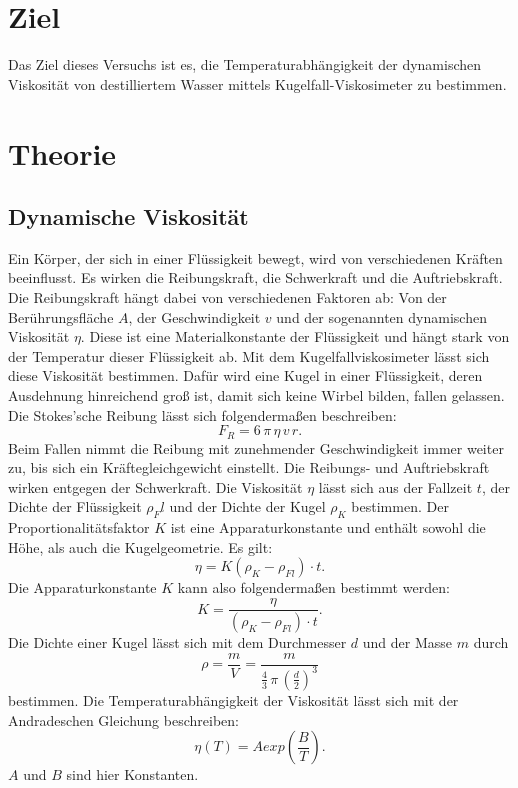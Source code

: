 \section{Ziel}
Das Ziel dieses Versuchs ist es, die Temperaturabhängigkeit
der dynamischen Viskosität von destilliertem Wasser mittels
Kugelfall-Viskosimeter zu bestimmen.

\section{Theorie}
\label{sec:Theorie}

\subsection{Dynamische Viskosität}
Ein Körper, der sich in einer Flüssigkeit bewegt, wird von verschiedenen Kräften beeinflusst. 
Es wirken die Reibungskraft, die Schwerkraft und die Auftriebskraft. 
Die Reibungskraft hängt dabei von verschiedenen Faktoren ab:
Von der Berührungsfläche $A$, der Geschwindigkeit $v$ und
der sogenannten dynamischen Viskosität $\eta$. 
Diese ist eine Materialkonstante der Flüssigkeit und hängt stark von der Temperatur dieser Flüssigkeit ab. 
\newline
Mit dem Kugelfallviskosimeter lässt sich diese Viskosität bestimmen. 
Dafür wird eine Kugel in einer Flüssigkeit, deren Ausdehnung hinreichend groß ist, 
damit sich keine Wirbel bilden, fallen gelassen. 
Die Stokes'sche Reibung lässt sich folgendermaßen beschreiben:
\begin{equation*}
    F_R = 6 \, \pi \, \eta \, v \, r.
\end{equation*}
Beim Fallen nimmt die Reibung mit zunehmender Geschwindigkeit immer weiter zu, 
bis sich ein Kräftegleichgewicht einstellt. 
Die Reibungs- und Auftriebskraft wirken entgegen der Schwerkraft. 
Die Viskosität $\eta$ lässt sich aus der Fallzeit $t$, 
der Dichte der Flüssigkeit $\rho_Fl$ und der Dichte der Kugel $\rho_K$ bestimmen.
Der Proportionalitätsfaktor $K$ ist eine Apparaturkonstante und enthält sowohl die Höhe,
als auch die Kugelgeometrie.
Es gilt:
\begin{equation}
    \eta = K (\rho_K -\rho_{Fl}) \cdot t.
    \label{eqn:eta}
\end{equation}
Die Apparaturkonstante $K$ kann also folgendermaßen bestimmt werden:
\begin{equation}
    K = \frac{\eta}{(\rho_{K}-\rho_{Fl}) \cdot t}.
    \label{eqn:K}
\end{equation}
Die Dichte einer Kugel lässt sich mit dem Durchmesser $d$ und der Masse $m$ durch 
\begin{equation}
    \rho = \frac{m}{V} = \frac{m}{\frac{4}{3} \, \pi \, \left( \frac{d}{2} \right)^3}
    \label{eqn:dichte}
\end{equation}
bestimmen.
Die Temperaturabhängigkeit der Viskosität lässt sich mit der Andradeschen Gleichung 
beschreiben: 
\begin{equation}
    \eta(T) = A exp \left( \frac{B}{T} \right). %
    \label{eqn:temp}
\end{equation}
$A$ und $B$ sind hier Konstanten.

